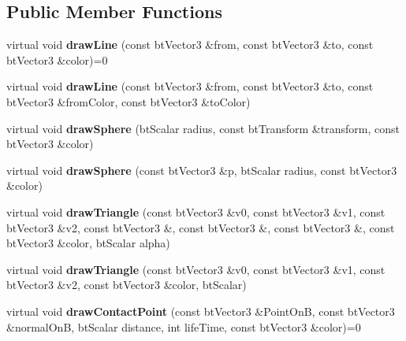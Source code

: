 \subsection*{Public Member Functions}
\begin{DoxyCompactItemize}
\item 
\mbox{\label{classbtIDebugDraw_a07b08e255ab4607ab5aeb24399332aff}} 
virtual void {\bfseries draw\+Line} (const bt\+Vector3 \&from, const bt\+Vector3 \&to, const bt\+Vector3 \&color)=0
\item 
\mbox{\label{classbtIDebugDraw_a0e9e92ccb0b2eec9c2fc8792a286af9a}} 
virtual void {\bfseries draw\+Line} (const bt\+Vector3 \&from, const bt\+Vector3 \&to, const bt\+Vector3 \&from\+Color, const bt\+Vector3 \&to\+Color)
\item 
\mbox{\label{classbtIDebugDraw_a29033d7c4f7d8c1745301bc4b5253f3b}} 
virtual void {\bfseries draw\+Sphere} (bt\+Scalar radius, const bt\+Transform \&transform, const bt\+Vector3 \&color)
\item 
\mbox{\label{classbtIDebugDraw_a49e2bf7b122f241b7b29913888d6825b}} 
virtual void {\bfseries draw\+Sphere} (const bt\+Vector3 \&p, bt\+Scalar radius, const bt\+Vector3 \&color)
\item 
\mbox{\label{classbtIDebugDraw_a3f0eec1b40109254182f0fe35f6308d0}} 
virtual void {\bfseries draw\+Triangle} (const bt\+Vector3 \&v0, const bt\+Vector3 \&v1, const bt\+Vector3 \&v2, const bt\+Vector3 \&, const bt\+Vector3 \&, const bt\+Vector3 \&, const bt\+Vector3 \&color, bt\+Scalar alpha)
\item 
\mbox{\label{classbtIDebugDraw_ae537cc49a9061703ec1f1be33cf24ea3}} 
virtual void {\bfseries draw\+Triangle} (const bt\+Vector3 \&v0, const bt\+Vector3 \&v1, const bt\+Vector3 \&v2, const bt\+Vector3 \&color, bt\+Scalar)
\item 
\mbox{\label{classbtIDebugDraw_a791eba72577f83519499bd646bb4a3f1}} 
virtual void {\bfseries draw\+Contact\+Point} (const bt\+Vector3 \&Point\+OnB, const bt\+Vector3 \&normal\+OnB, bt\+Scalar distance, int life\+Time, const bt\+Vector3 \&color)=0
\item 

\end{DoxyCompactItemize}
